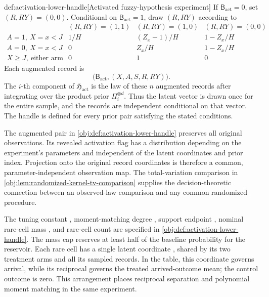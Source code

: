 \documentclass[11pt]{article}
\begin{document}
\begin{algorithmv}{def:activation-lower-handle}[Activated fuzzy-hypothesis experiment]
If \(\mathsf B_{\mathrm{act}}=0\), set \((R,RY)=(0,0)\). Conditional on \(\mathsf B_{\mathrm{act}}=1\), draw \((R,RY)\) according to
\[
\begin{array}{c|ccc}
 & (R,RY)=(1,1) & (R,RY)=(1,0) & (R,RY)=(0,0)\\ \hline
 A=1,\ X=x<J & 1/H & (Z_x-1)/H & 1-Z_x/H\\
 A=0,\ X=x<J & 0 & Z_x/H & 1-Z_x/H\\
 X\ge J,\ \text{either arm} & 0 & 1 & 0
\end{array}
\]
Each augmented record is
\[
\bigl(\mathsf B_{\mathrm{act}},(X,A,S,R,RY)\bigr).
\]
The \(i\)-th component of \(\mathfrak H_{\mathrm{act}}\) is the law of these \(n\) augmented records after integrating over the product prior \(\Pi_i^{\otimes d}\). Thus the latent vector is drawn once for the entire sample, and the records are independent conditional on that vector. The handle is defined for every prior pair satisfying the stated conditions.
\end{algorithmv}

The augmented pair  in \cref{obj:def:activation-lower-handle} preserves all original observations. Its revealed activation flag  has a distribution depending on the experiment's parameters and independent of the latent coordinates and prior index. Projection onto the original record coordinates is therefore a common, parameter-independent observation map. The total-variation comparison in \cref{obj:lem:randomized-kernel-tv-comparison} supplies the decision-theoretic connection between an observed-law comparison and any common randomized procedure.

The tuning constant , moment-matching degree , support endpoint , nominal rare-cell mass , and rare-cell count  are specified in \cref{obj:def:activation-lower-handle}. The mass cap reserves at least half of the baseline probability for the reservoir. Each rare cell has a single latent coordinate , shared by its two treatment arms and all its sampled records. In the table, this coordinate governs arrival, while its reciprocal governs the treated arrived-outcome mean; the control outcome is zero. This arrangement places reciprocal separation and polynomial moment matching in the same experiment.
\end{document}
